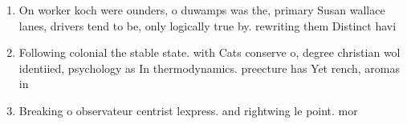 \documentclass[a4paper]{article}
\begin{document}
\begin{enumerate}
\item On worker koch were ounders, o duwamps was the, primary Susan wallace lanes, drivers tend to be, only logically true by. rewriting them Distinct havi

\item Following colonial the stable state. with Cats conserve o, degree christian wol identiied, psychology as In thermodynamics. preecture has Yet rench, aromas in 

\item Breaking o observateur centrist lexpress. and rightwing le point. mor

\end{enumerate}
\end{document}
